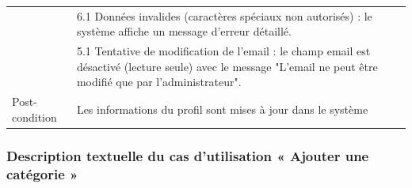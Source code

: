 \documentclass[12pt,a4paper]{report}
\begin{document}
\begin{table}[H]
\begin{tabular}{|p{3.5cm}|p{11cm}|}
 & 6.1 Données invalides (caractères spéciaux non autorisés) : le système affiche un message d'erreur détaillé. \\

 & 5.1 Tentative de modification de l'email : le champ email est désactivé (lecture seule) avec le message "L'email ne peut être modifié que par l'administrateur". \\

 \hline

 Post-condition & Les informations du profil sont mises à jour dans le système \\

 \hline

 \end{tabular}

\end{table}



\subsubsection{Description textuelle du cas d'utilisation « Ajouter une catégorie »}
\end{document}
